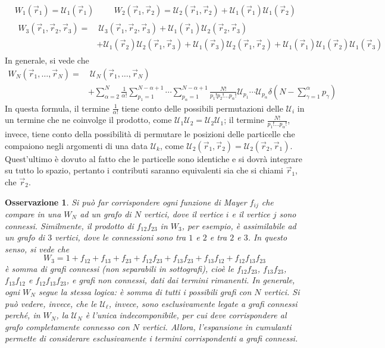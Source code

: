 \documentclass[11pt, a4paper]{scrartcl}
\theoremstyle{style}
\newtheorem{osservazione}{Osservazione}[section]
\theoremstyle{style1}
\numberwithin{equation}{subsection}
\begin{document}
\[
	\begin{split}
		&W_1(\vec{r}_1) = \mathcal{U} _1(\vec{r}_1) \hspace{1cm} W_2(\vec{r}_1,\vec{r}_2) = \mathcal{U} _2(\vec{r}_1,\vec{r}_2)+ \mathcal{U} _1(\vec{r}_1) \mathcal{U} _1(\vec{r}_2)\\
		&\begin{split}
			W_3(\vec{r}_1, \vec{r}_2,\vec{r}_3) =&\ \mathcal{U} _3 (\vec{r}_1, \vec{r}_2, \vec{r}_3) + \mathcal{U} _1(\vec{r}_1) \mathcal{U} _2(\vec{r}_2,\vec{r}_3) \\
							     &+\mathcal{U} _1(\vec{r}_2)\mathcal{U} _2(\vec{r}_1, \vec{r}_3) + \mathcal{U} _1(\vec{r}_3) \mathcal{U} _2(\vec{r}_1,\vec{r}_2) + \mathcal{U} _1(\vec{r}_1)\mathcal{U} _1(\vec{r}_2)\mathcal{U} _1(\vec{r}_3)
		\end{split}
	\end{split}
\] 
In generale, si vede che
\[
	\begin{split}
		W_N (\vec{r}_1,\ldots,\vec{r}_N) =&\ \mathcal{U} _N(\vec{r}_1,\ldots,\vec{r}_N) \\
						  &+ \sum_{\alpha =2}^{N} \frac{1}{\alpha !} \sum_{p_1=1}^{N-\alpha+1 }\cdots \sum_{p_\alpha =1}^{N-\alpha +1} \frac{N!}{p_1!p_2!\ldots p_\alpha !} \mathcal{U} _{p_1} \cdots \mathcal{U} _{p_\alpha } \delta \left(N - \sum_{\gamma=1}^{\alpha } p_\gamma\right)   
	\end{split}
\] 
In questa formula, il termine $\frac{1}{\alpha !}$ tiene conto delle possibili permutazioni delle $\mathcal{U}_i$ in un termine che ne coinvolge il prodotto, come $\mathcal{U} _1 \mathcal{U} _2 = \mathcal{U} _2 \mathcal{U} _1$; il termine $\frac{N!}{p_1! \ldots p_\alpha !}$, invece, tiene conto della possibilit\`a di permutare le posizioni delle particelle che compaiono negli argomenti di una data $\mathcal{U} _k$, come $\mathcal{U} _2 (\vec{r}_1,\vec{r}_2) = \mathcal{U} _2 ( \vec{r}_2, \vec{r}_1)$. 
Quest'ultimo \`e dovuto al fatto che le particelle sono identiche e si dovr\`a integrare su tutto lo spazio, pertanto i contributi saranno equivalenti sia che si chiami $\vec{r}_1$, che $\vec{r}_2$.
\begin{osservazione}
Si pu\`o far corrispondere ogni funzione di Mayer $f_{ij} $ che compare in una $W_N$ ad un grafo di $N$ vertici, dove il vertice $i$ e il vertice $j$ sono connessi.
Similmente, il prodotto di $f_{12} f_{23} $ in $W_3$, per esempio, \`e assimilabile ad un grafo di $3$ vertici, dove le connessioni sono tra $1$ e $2$ e tra $2$ e $3$.
In questo senso, si vede che 
\[
W_3 = 1 + f_{12} + f_{13}+ f_{23}+ f_{12}f_{23}+f_{13}f_{23}+f_{13}f_{12}+f_{12}f_{13}f_{23}
\] 
\`e somma di grafi connessi (non separabili in sottografi), cio\`e le $f_{12}f_{23}$, $f_{13}f_{23}$, $f_{13}f_{12}$ e $f_{12}f_{13}f_{23}$, e grafi non connessi, dati dai termini rimanenti.
In generale, ogni $W_N$ segue la stessa logica: \`e somma di tutti i possibili grafi con $N$ vertici. 
Si pu\`o vedere, invece, che le $\mathcal{U} _\ell $, invece, sono esclusivamente legate a grafi connessi perch\'e, in $W_N$, la $\mathcal{U} _N$ \`e l'unica indecomponibile, per cui deve corrispondere al grafo completamente connesso con $N$ vertici.
Allora, l'espansione in cumulanti permette di considerare esclusivamente i termini corrispondenti a grafi connessi.
\end{osservazione}
\end{document}
